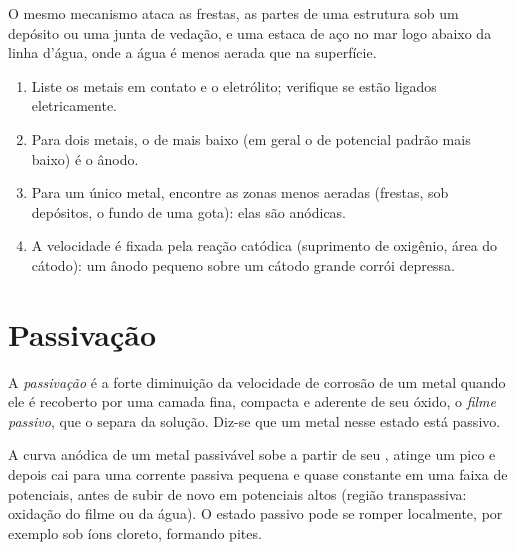 O mesmo mecanismo ataca as frestas, as partes de uma estrutura sob um depósito
ou uma junta de vedação, e uma estaca de aço no mar logo abaixo da linha
d'água, onde a água é menos aerada que na superfície.

\begin{method}\label{met:b2:corrosion:diagnose}
\begin{enumerate}
  \item Liste os metais em contato e o eletrólito; verifique se estão
        ligados eletricamente.
  \item Para dois metais, o de  mais baixo (em geral o
        de potencial padrão mais baixo) é o ânodo.
  \item Para um único metal, encontre as zonas menos aeradas (frestas, sob
        depósitos, o fundo de uma gota): elas são anódicas.
  \item A velocidade é fixada pela reação catódica (suprimento de oxigênio,
        área do cátodo): um ânodo pequeno sobre um cátodo grande corrói depressa.
\end{enumerate}
\end{method}

\section{Passivação}

\begin{definition}[Passivação]\label{def:b2:corrosion:passivation}
A \emph{passivação} é a forte diminuição da velocidade de
corrosão de um metal quando ele é recoberto por uma camada fina, compacta e
aderente de seu óxido, o \emph{filme passivo}, que o separa da
solução. Diz-se que um metal nesse estado está passivo.
\end{definition}

\begin{proposition}\label{prop:b2:corrosion:passivity}
A curva anódica de um metal passivável sobe a partir de seu , atinge um pico e depois cai para uma corrente passiva pequena e
quase constante em uma faixa de potenciais, antes de subir de novo em
potenciais altos (região transpassiva: oxidação do filme ou da água). O estado
passivo pode se romper localmente, por exemplo sob íons cloreto, formando pites.
\end{proposition}

